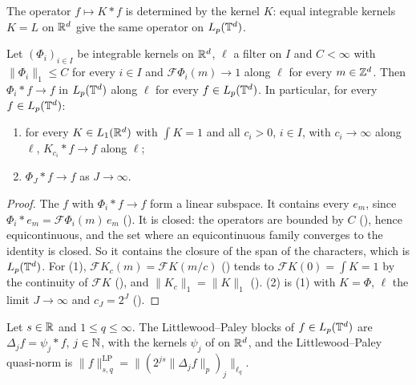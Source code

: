The operator $f \mapsto K * f$ is determined by the kernel $K$: equal integrable kernels $K = L$
on $\mathbb{R}^d$ give the same operator on $L_p(\mathbb{T}^d)$.

\begin{theorem}
\label{thm:torus-approx-identity}
\leanok
{}
Let $(\Phi_i)_{i \in I}$ be integrable kernels on $\mathbb{R}^d$, $\ell$ a filter on $I$ and
$C < \infty$ with $\|\Phi_i\|_1 \leq C$ for every $i \in I$ and $\mathcal{F}\Phi_i(m) \to 1$ along
$\ell$ for every $m \in \mathbb{Z}^d$. Then $\Phi_i * f \to f$ in $L_p(\mathbb{T}^d)$ along $\ell$ for every
$f \in L_p(\mathbb{T}^d)$. In particular, for every $f \in L_p(\mathbb{T}^d)$:
\begin{enumerate}
  \item for every $K \in L_1(\mathbb{R}^d)$ with $\int K = 1$ and all $c_i > 0$, $i \in I$, with
    $c_i \to \infty$ along $\ell$, $K_{c_i} * f \to f$ along $\ell$;
  \item $\Phi_J * f \to f$ as $J \to \infty$.
\end{enumerate}
\end{theorem}

\begin{proof}
\leanok
The $f$ with $\Phi_i * f \to f$ form a linear subspace. It contains every $e_m$, since
$\Phi_i * e_m = \mathcal{F}\Phi_i(m) \, e_m$ (). It is closed: the
operators are bounded by $C$ (), hence equicontinuous, and the set
where an equicontinuous family converges to the identity is closed. So it contains the closure
of the span of the characters, which is $L_p(\mathbb{T}^d)$. For (1), $\mathcal{F}K_c(m) =
\mathcal{F}K(m / c)$ () tends to $\mathcal{F}K(0) = \int K = 1$ by the
continuity of $\mathcal{F}K$ (), and $\|K_c\|_1 = \|K\|_1$
(). (2) is (1) with $K = \Phi$, $\ell$ the limit $J \to \infty$ and
$c_J = 2^J$ ().
\end{proof}

\begin{definition}
\label{def:torus-lp-blocks}
\leanok
{}
Let $s \in \mathbb{R}$ and $1 \leq q \leq \infty$. The Littlewood--Paley blocks of $f \in L_p(\mathbb{T}^d)$ are
$\Delta_j f = \psi_j * f$, $j \in \mathbb{N}$, with the kernels $\psi_j$ of  on
$\mathbb{R}^d$, and the Littlewood--Paley quasi-norm is
$\|f\|^{\mathrm{LP}}_{s,q} = \|(2^{js} \|\Delta_j f\|_p)_j\|_{\ell_q}$.
\end{definition}

